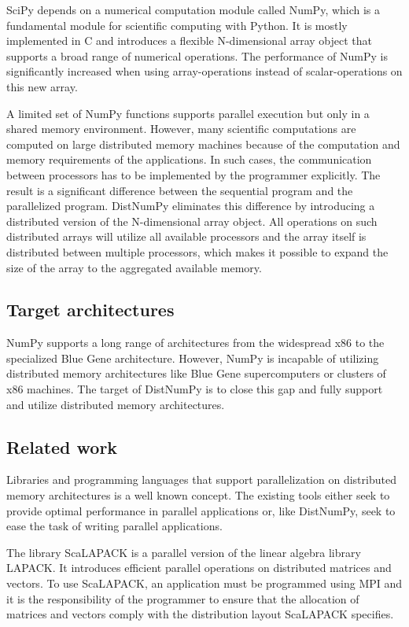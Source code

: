 \documentclass[10pt]{article}
\begin{document}
SciPy depends on a numerical computation module called NumPy\cite{numpy}, which is a fundamental module for scientific computing with Python. It is mostly implemented in C and introduces a flexible N-dimensional array object that supports a broad range of numerical operations. The performance of NumPy is significantly increased when using array-operations instead of scalar-operations on this new array.

A limited set of NumPy functions supports parallel execution but only in a shared memory environment. However, many scientific computations are computed on large distributed memory machines because of the computation and memory requirements of the applications. In such cases, the communication between processors has to be implemented by the programmer explicitly. The result is a significant difference between the sequential program and the parallelized program. DistNumPy eliminates this difference by introducing a distributed version of the N-dimensional array object. All operations on such distributed arrays will utilize all available processors and the array itself is distributed between multiple processors, which makes it possible to expand the size of the array to the aggregated available memory.


\subsection{Target architectures}
NumPy supports a long range of architectures from the widespread x86 to the specialized Blue Gene architecture. However, NumPy is incapable of utilizing distributed memory architectures like Blue Gene supercomputers or clusters of x86 machines. The target of DistNumPy is to close this gap and fully support and utilize distributed memory architectures. 


\subsection{Related work}
Libraries and programming languages that support parallelization on distributed memory architectures is a well known concept. The existing tools either seek to provide optimal performance in parallel applications or, like DistNumPy, seek to ease the task of writing parallel applications.

The library ScaLAPACK\cite{Blackford96} is a parallel version of the linear algebra library LAPACK\cite{lapack90}. It introduces efficient parallel operations on distributed matrices and vectors. To use ScaLAPACK, an application must be programmed using MPI\cite{mpi} and it is the responsibility of the programmer to ensure that the allocation of matrices and vectors comply with the distribution layout ScaLAPACK specifies.
\end{document}
